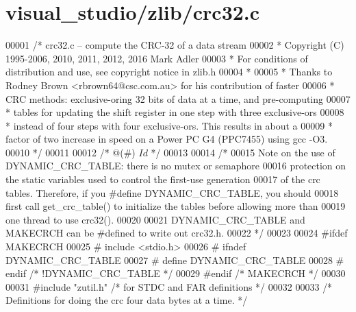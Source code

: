 \hypertarget{visual__studio_2zlib_2crc32_8c_source}{}\section{visual\+\_\+studio/zlib/crc32.c}
\label{visual__studio_2zlib_2crc32_8c_source}

\begin{DoxyCode}
00001 \textcolor{comment}{/* crc32.c -- compute the CRC-32 of a data stream}
00002 \textcolor{comment}{ * Copyright (C) 1995-2006, 2010, 2011, 2012, 2016 Mark Adler}
00003 \textcolor{comment}{ * For conditions of distribution and use, see copyright notice in zlib.h}
00004 \textcolor{comment}{ *}
00005 \textcolor{comment}{ * Thanks to Rodney Brown <rbrown64@csc.com.au> for his contribution of faster}
00006 \textcolor{comment}{ * CRC methods: exclusive-oring 32 bits of data at a time, and pre-computing}
00007 \textcolor{comment}{ * tables for updating the shift register in one step with three exclusive-ors}
00008 \textcolor{comment}{ * instead of four steps with four exclusive-ors.  This results in about a}
00009 \textcolor{comment}{ * factor of two increase in speed on a Power PC G4 (PPC7455) using gcc -O3.}
00010 \textcolor{comment}{ */}
00011 
00012 \textcolor{comment}{/* @(#) $Id$ */}
00013 
00014 \textcolor{comment}{/*}
00015 \textcolor{comment}{  Note on the use of DYNAMIC\_CRC\_TABLE: there is no mutex or semaphore}
00016 \textcolor{comment}{  protection on the static variables used to control the first-use generation}
00017 \textcolor{comment}{  of the crc tables.  Therefore, if you #define DYNAMIC\_CRC\_TABLE, you should}
00018 \textcolor{comment}{  first call get\_crc\_table() to initialize the tables before allowing more than}
00019 \textcolor{comment}{  one thread to use crc32().}
00020 \textcolor{comment}{}
00021 \textcolor{comment}{  DYNAMIC\_CRC\_TABLE and MAKECRCH can be #defined to write out crc32.h.}
00022 \textcolor{comment}{ */}
00023 
00024 \textcolor{preprocessor}{#ifdef MAKECRCH}
00025 \textcolor{preprocessor}{#  include <stdio.h>}
00026 \textcolor{preprocessor}{#  ifndef DYNAMIC\_CRC\_TABLE}
00027 \textcolor{preprocessor}{#    define DYNAMIC\_CRC\_TABLE}
00028 \textcolor{preprocessor}{#  endif }\textcolor{comment}{/* !DYNAMIC\_CRC\_TABLE */}\textcolor{preprocessor}{}
00029 \textcolor{preprocessor}{#endif }\textcolor{comment}{/* MAKECRCH */}\textcolor{preprocessor}{}
00030 
00031 \textcolor{preprocessor}{#include "zutil.h"}      \textcolor{comment}{/* for STDC and FAR definitions */}
00032 
00033 \textcolor{comment}{/* Definitions for doing the crc four data bytes at a time. */}

\end{DoxyCode}
